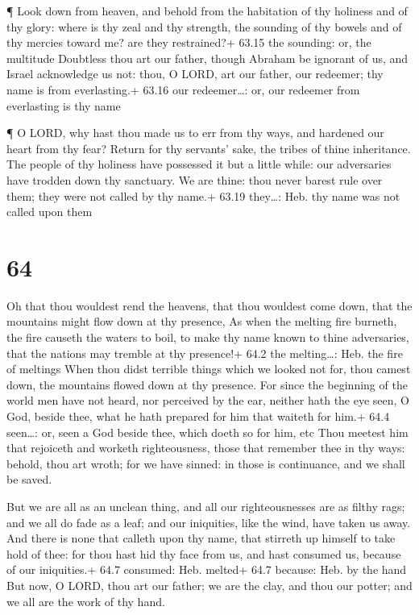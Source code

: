  ¶ Look down from heaven, and behold from the habitation of
thy holiness and of thy glory: where is thy zeal and thy strength, the
sounding of thy bowels and of thy mercies toward me? are they
restrained?+ 63.15 the sounding: or, the multitude 
Doubtless thou art our father, though Abraham be ignorant of us, and
Israel acknowledge us not: thou, O LORD, art our father, our redeemer;
thy name is from everlasting.+ 63.16 our redeemer\ldots: or, our
redeemer from everlasting is thy name

 ¶ O LORD, why hast thou made us to err from thy ways, and
hardened our heart from thy fear? Return for thy servants' sake, the
tribes of thine inheritance.  The people of thy holiness
have possessed it but a little while: our adversaries have trodden down
thy sanctuary.  We are thine: thou never barest rule over
them; they were not called by thy name.+ 63.19 they\ldots: Heb. thy name
was not called upon them

\hypertarget{section-63}{%
\section{64}\label{section-63}}

 Oh that thou wouldest rend the heavens, that thou wouldest
come down, that the mountains might flow down at thy presence,
 As when the melting fire burneth, the fire causeth the
waters to boil, to make thy name known to thine adversaries, that the
nations may tremble at thy presence!+ 64.2 the melting\ldots: Heb. the
fire of meltings  When thou didst terrible things which we
looked not for, thou camest down, the mountains flowed down at thy
presence.  For since the beginning of the world men have not
heard, nor perceived by the ear, neither hath the eye seen, O God,
beside thee, what he hath prepared for him that waiteth for him.+ 64.4
seen\ldots: or, seen a God beside thee, which doeth so for him, etc
 Thou meetest him that rejoiceth and worketh righteousness,
those that remember thee in thy ways: behold, thou art wroth; for we
have sinned: in those is continuance, and we shall be saved.

 But we are all as an unclean thing, and all our
righteousnesses are as filthy rags; and we all do fade as a leaf; and
our iniquities, like the wind, have taken us away.  And
there is none that calleth upon thy name, that stirreth up himself to
take hold of thee: for thou hast hid thy face from us, and hast consumed
us, because of our iniquities.+ 64.7 consumed: Heb. melted+ 64.7
because: Heb. by the hand  But now, O LORD, thou art our
father; we are the clay, and thou our potter; and we all are the work of
thy hand.

